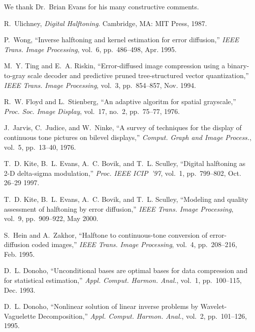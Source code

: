 \documentclass[11pt]{article}
\begin{document}
{\acknowledgments We thank Dr.\ Brian Evans for his many constructive
comments.}  
\sloppy
\newcommand{\noopsort}[1]{} \newcommand{\printfirst}[2]{#1}
  \newcommand{\singleletter}[1]{#1} \newcommand{\switchargs}[2]{#2#1}
\begin{thebibliography}{10}

R.~Ulichney, {\em Digital Halftoning}.
\newblock Cambridge, MA: MIT Press, 1987.

P.~Wong, ``Inverse halftoning and kernel estimation for error diffusion,'' {\em
  IEEE Trans. Image Processing}, vol.~6, pp.~486--498, Apr. 1995.

M.~Y. Ting and E.~A. Riskin, ``Error-diffused image compression using a
  binary-to-gray scale decoder and predictive pruned tree-structured vector
  quantization,'' {\em IEEE Trans. Image Processing}, vol.~3, pp.~854--857,
  Nov. 1994.

R.~W. Floyd and L.~Stienberg, ``An adaptive algoritm for spatial grayscale,''
  {\em Proc. Soc. Image Display}, vol.~17, no.~2, pp.~75--77, 1976.

J.~Jarvis, C.~Judice, and W.~Ninke, ``A survey of techniques for the display of
  continuous tone pictures on bilevel displays,'' {\em Comput. Graph and Image
  Process.}, vol.~5, pp.~13--40, 1976.

T.~D. Kite, B.~L. Evans, A.~C. Bovik, and T.~L. Sculley, ``Digital halftoning
  as 2-{D} delta-sigma modulation,'' {\em Proc. IEEE ICIP~'97}, vol.~1,
  pp.~799--802, Oct. 26--29 1997.

T.~D. Kite, B.~L. Evans, A.~C. Bovik, and T.~L. Sculley, ``Modeling and quality
  assessment of halftoning by error diffusion,'' {\em IEEE Trans. Image
  Processing}, vol.~9, pp.~909--922, May 2000.

S.~Hein and A.~Zakhor, ``Halftone to continuous-tone conversion of
  error-diffusion coded images,'' {\em IEEE Trans. Image Processing}, vol.~4,
  pp.~208--216, Feb. 1995.

D.~L. Donoho, ``Unconditional bases are optimal bases for data compression and
  for statistical estimation,'' {\em Appl. Comput. Harmon. Anal.}, vol.~1,
  pp.~100--115, Dec. 1993.

D.~L. Donoho, ``Nonlinear solution of linear inverse problems by
  {W}avelet-{V}aguelette {D}ecomposition,'' {\em Appl. Comput. Harmon. Anal.},
  vol.~2, pp.~101--126, 1995.


\end{thebibliography}
\end{document}
